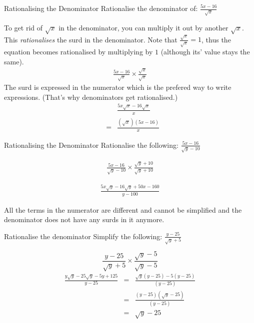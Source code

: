 \begin{wex}{Rationalising the Denominator}
{Rationalise the denominator of: $\frac{5x - 16}{\sqrt{x}}$}{

To get rid of $\sqrt{x}$ in the denominator, you can multiply it out by another $\sqrt{x}$. This \textit{rationalises} the surd in the denominator. Note that $\frac{\sqrt{x}}{\sqrt{x}} = 1$, thus the equation becomes rationalised by multiplying by $1$ (although its' value stays the same).
    \begin{eqnarray*}
\frac{5x - 16}{\sqrt{x}} \times \frac{\sqrt{x}}{\sqrt{x}}
\end{eqnarray*}
The surd is expressed in the numerator which is the prefered way to write expressions. (That's why denominators get rationalised.)
\begin{eqnarray*}
 & &\frac{5x\sqrt{x} - 16\sqrt{x}}{x}\\
 & = &\frac{(\sqrt{x})(5x - 16)}{x}
\end{eqnarray*}
}
\end{wex}

\begin{wex}{Rationalising the Denominator} 
{Rationalise the following: $\frac{5x - 16}{\sqrt{y} - 10}$}{
\begin{eqnarray*}
\frac{5x - 16}{\sqrt{y} - 10} \times \frac{\sqrt{y} + 10}{\sqrt{y} + 10}
\end{eqnarray*}
    
\begin{eqnarray*}
\frac{5x\sqrt{y} - 16\sqrt{y} + 50x - 160}{y - 100}
\end{eqnarray*}
    
All the terms in the numerator are different and cannot be simplified and the denominator does not have any surds in it anymore.}
\end{wex}

\begin{wex}{Rationalise the denominator}
{Simplify the following: $\frac{y-25}{\sqrt{y} + 5}$}{

    \begin{equation*}
\frac{y-25}{\sqrt{y} + 5} \times \frac{\sqrt{y} - 5}{\sqrt{y} - 5}
\end{equation*}
    \begin{eqnarray*}
\frac{y\sqrt{y} - 25\sqrt{y} - 5y + 125}{y - 25} &=& \frac{\sqrt{y}(y - 25) - 5(y-25)}{(y-25)}\\
&=& \frac{(y-25)(\sqrt{y} - 25)}{(y - 25)}\\
&=& \sqrt{y} - 25
\end{eqnarray*}
}
\end{wex}


